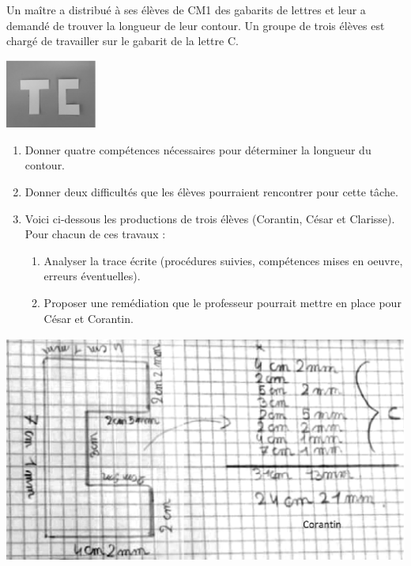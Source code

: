 {\bigskip


\begin{exercice}[CRPE 2016 G3]
\begin{minipage}{12cm}
   Un maître a distribué à ses élèves de CM1 des gabarits de lettres et leur a demandé de trouver la longueur de leur contour. Un groupe de trois élèves est chargé de travailler sur le gabarit de la lettre C.
\end{minipage}
\qquad
\begin{minipage}{4cm}
      \includegraphics[width=3cm]{Grandeurs_mesures_did/Images/Grm7_analyse_TC}
\end{minipage}
\begin{enumerate}
   \item Donner quatre compétences nécessaires pour déterminer la longueur du contour.
   \item Donner deux difficultés que les élèves pourraient rencontrer pour cette tâche.
   \item Voici ci-dessous les productions de trois élèves (Corantin, César et Clarisse). Pour chacun de ces travaux :
   \begin{enumerate}
      \item Analyser la trace écrite (procédures suivies, compétences mises en oeuvre, erreurs éventuelles).
      \item Proposer une remédiation que le professeur pourrait mettre en place pour César et Corantin.
   \end{enumerate}
\end{enumerate}
\begin{center}
   \includegraphics[height=7.5cm]{Grandeurs_mesures_did/Images/Grm7_analyse_TC_Corantin} \\ [5mm]

\end{center}
\end{exercice}}

